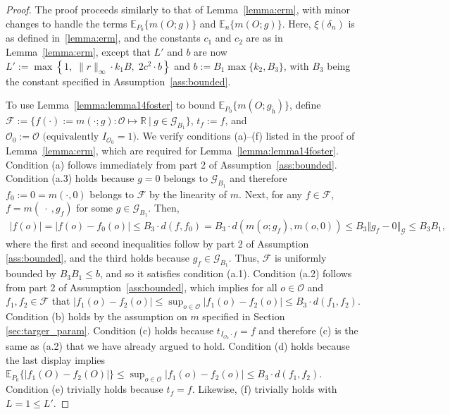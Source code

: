 \documentclass[twoside,11pt]{article}
\newcommand{\E}{\mathbb{E}}
\newcommand{\mc}{\mathcal}
\begin{document}
\begin{proof}
The proof proceeds similarly to that of Lemma~\ref{lemma:erm}, with minor changes to handle the terms  $\E_{P_0}\{m(O;g)\}$ and $\E_n\{m(O;g)\}$. Here, $\xi(\delta_n)$ is as defined in~\ref{lemma:erm}, and the constants $c_1$ and $c_2$ are as in Lemma~\ref{lemma:erm}, except that $L'$ and $b$ are now $L' := \max\left\{1,\; \|r\|_\infty \cdot k_1 B,\; 2c^2 \cdot b \right\}$ and $ b:=B_1\max\{k_2,B_3\}$,
with $B_3$ being the constant specified in Assumption~\ref{ass:bounded}.

To use Lemma~\ref{lemma:lemma14foster} to bound $\E_{P_0}\{m(O;g_{\tilde h})\}$, define $\mc{F}:=\{f(\cdot) :=m(\cdot;g):\mc{O}\mapsto\mathbb{R}\:|\: g\in\mc{G}_{B_1}\}$, $t_f:=f$, and $\mc{O}_0:=\mc{O}\text{ (equivalently $I_{\mc{O}_0}=1$)}$. We verify conditions (a)--(f) listed in the proof of Lemma~\ref{lemma:erm}, which are required for Lemma~\ref{lemma:lemma14foster}. Condition (a) follows immediately from part 2 of Assumption~\ref{ass:bounded}.  Condition (a.3) holds because $g=0$ belongs to $\mc{G}_{B_1}$ and therefore $f_0:=0=m(\cdot,0)$ belongs to $\mc{F}$ by the linearity of $m$. Next, for any $f \in \mc{F}$, $f=m(\:\cdot\:,g_f)$ for some $g\in\mc{G}_{B_1}$. Then, 
    \begin{align*}
    |f(o)| = |f(o)-f_0(o)|\le B_3\cdot d(f,f_0)= B_3\cdot d(m(o;g_f),m(o,0))
    \le B_3\Vert g_f-0\Vert_\mc{G}\le B_3B_1,
    \end{align*} 
    where the first and second inequalities follow by part 2 of Assumption \ref{ass:bounded}, and the third holds because $g_f \in \mc{G}_{B_1}$. Thus, $\mc{F}$  is uniformly bounded by $B_3B_1\le b$, and so it satisfies condition (a.1). Condition (a.2) follows from part 2 of Assumption~\ref{ass:bounded}, which implies for all $o\in\mc{O}$ and $f_1,f_2\in\mc{F}$ that $ |f_1(o)-f_2(o)|\le\sup_{o\in\mc{O}}|f_1(o)-f_2(o)|\le B_3\cdot d(f_1,f_2)$. Condition (b) holds by the assumption on $m$ specified in Section \ref{sec:targer_param}. Condition (c) holds because $t_{I_{\mc{O}_0}\cdot f}=f$ and therefore (c) is the same as (a.2) that we have already argued to hold. Condition (d) holds because the last display implies $\E_{P_0}\{|f_1(O)-f_2(O)|\}\le\sup_{o\in\mc{O}}|f_1(o)-f_2(o)|\le  B_3\cdot d(f_1,f_2)$. Condition (e) trivially holds because $t_f=f$. Likewise, (f) trivially holds with $L=1\le L'$.


\end{proof}
\end{document}
